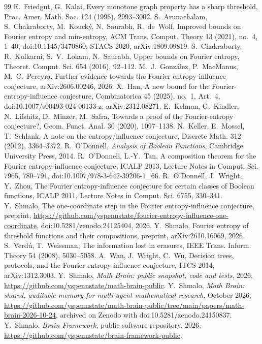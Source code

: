 \documentclass[11pt]{amsart}
\theoremstyle{remark}
\begin{document}
\begin{thebibliography}{99}
 E.~Friedgut, G.~Kalai, Every monotone graph property has a sharp threshold, Proc. Amer. Math. Soc.
124 (1996), 2993--3002.
 S.~Arunachalam, S.~Chakraborty, M.~Kouck\'y, N.~Saurabh, R.~de~Wolf, Improved bounds on Fourier
entropy and min-entropy, ACM Trans. Comput. Theory 13 (2021), no.~4, 1--40, doi:10.1145/3470860; STACS 2020, arXiv:1809.09819.
 S.~Chakraborty, R.~Kulkarni, S.~V.~Lokam, N.~Saurabh, Upper bounds on Fourier entropy, Theoret.
Comput. Sci. 654 (2016), 92--112.
 M.~J.~Gonz\'alez, P.~MacManus, M.~C.~Pereyra, Further evidence towards the Fourier
entropy-influence conjecture, arXiv:2606.00246, 2026.
 X.~Han, A new bound for the Fourier-entropy-influence conjecture, Combinatorica 45 (2025), no.~1,
Art.~4, doi:10.1007/s00493-024-00133-z; arXiv:2312.08271.
 E.~Kelman, G.~Kindler, N.~Lifshitz, D.~Minzer, M.~Safra, Towards a proof of the
Fourier-entropy conjecture?, Geom. Funct. Anal. 30 (2020), 1097--1138.
 N.~Keller, E.~Mossel, T.~Schlank, A note on the entropy/influence conjecture, Discrete Math. 312
(2012), 3364--3372.
 R.~O'Donnell, \emph{Analysis of Boolean Functions}, Cambridge University Press, 2014.
 R.~O'Donnell, L.-Y.~Tan, A composition theorem for the Fourier entropy-influence conjecture, ICALP 2013,
Lecture Notes in Comput. Sci. 7965, 780--791, doi:10.1007/978-3-642-39206-1\_66.
 R.~O'Donnell, J.~Wright, Y.~Zhou, The Fourier entropy-influence conjecture for certain classes of
Boolean functions, ICALP 2011, Lecture Notes in Comput. Sci. 6755, 330--341.
 Y.~Shmalo, The one-coordinate step in the Fourier entropy-influence conjecture,
preprint, \url{https://github.com/yspennstate/fourier-entropy-influence-one-coordinate}, doi:10.5281/zenodo.24125404, 2026.
 Y.~Shmalo, Fourier entropy of threshold functions and their compositions,
preprint, arXiv:2610.16069, 2026.
 S.~Verd\'u, T.~Weissman, The information lost in erasures, IEEE Trans. Inform. Theory 54 (2008),
5030--5058.
 A.~Wan, J.~Wright, C.~Wu, Decision trees, protocols, and the Fourier entropy-influence conjecture, ITCS 2014,
arXiv:1312.3003.
 Y.~Shmalo, \emph{Math Brain: public snapshot, code and tests}, 2026,
\url{https://github.com/yspennstate/math-brain-public}.
 Y.~Shmalo, \emph{Math Brain: shared, auditable memory for multi-agent mathematical research},
October 2026, \url{https://github.com/yspennstate/math-brain-public/tree/main/papers/math-brain-2026-10-24}, archived on Zenodo with doi:10.5281/zenodo.24150837.
 Y.~Shmalo, \emph{Brain Framework}, public software repository, 2026,
\url{https://github.com/yspennstate/brain-framework-public}.
\end{thebibliography}
\end{document}
